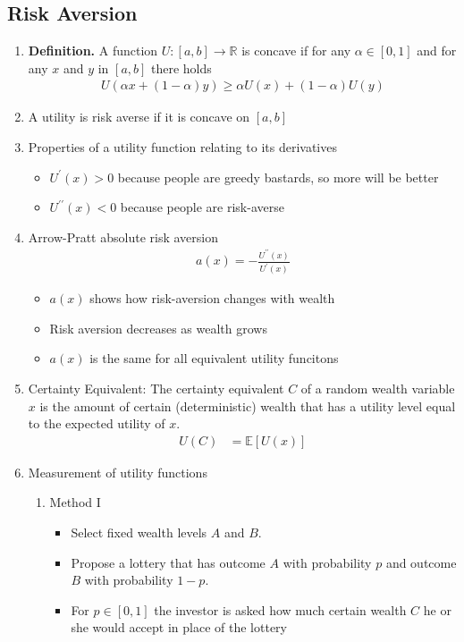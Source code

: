 \documentclass[12pt,twoside]{article}
\begin{document}
\subsection{Risk Aversion}
\begin{enumerate}
	\item \textbf{Definition.} A function $U: [a,b] \rightarrow \mathbb{R}$ is concave if for any $\alpha \in [0,1]$ and for any $x$ and $y$ in $[a,b]$ there holds 
	\begin{align*}
		U\left(\alpha x + (1-\alpha) y\right) \geq \alpha U(x)  + (1-\alpha) U(y)
	\end{align*}

	\item A utility is risk averse if it is concave on $[a,b]$

	\item Properties of a utility function relating to its derivatives
		\begin{itemize}
			\item $U^\prime(x)>0$ because people are greedy bastards, so more will be better
			\item $U^{\prime\prime}(x) < 0$  because people are risk-averse
		\end{itemize}

	\item Arrow-Pratt absolute risk aversion 
	\begin{align*}
		a(x) = - \frac{U^{\prime\prime}(x)}{U^\prime(x)}
	\end{align*}
	
		\begin{itemize}
			\item $a(x)$ shows how risk-aversion changes with wealth
			\item Risk aversion decreases as wealth grows
			\item $a(x)$ is the same for all equivalent utility funcitons
		\end{itemize}
		
	\item Certainty Equivalent: The certainty equivalent $C$ of a random wealth variable $x$ is the amount of certain (deterministic) wealth that has a utility level equal to the expected utility of $x$.
	\begin{align*}
		U(C) 	& = \mathbb{E}[U(x)]
	\end{align*}
	
	\item Measurement of utility functions
		\begin{enumerate}
			\item Method I
				\begin{itemize}
					\item Select fixed wealth levels $A$ and $B$.
					\item Propose a lottery that has outcome $A$ with probability $p$ and outcome $B$ with probability $1-p$.
					\item For $p\in [0,1]$ the investor is asked how much certain wealth $C$ he or she would accept in place of the lottery
				\end{itemize}
										

\end{enumerate}
\end{enumerate}
\end{document}
